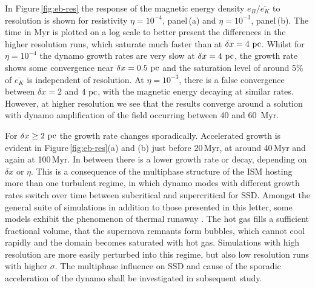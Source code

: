 \documentclass[preprint2]{aastex63}
\newcommand\pc{~ {\rm pc}}
\newcommand\dx{ {\delta x}}
\begin{document}
In Figure\,\ref{fig:eb-res} the response of the magnetic energy density 
$e_B/\overline{e_K}$ to resolution is shown for resistivity $\eta=10^{-4}$,
panel\,(a) and $\eta=10^{-3}$, panel\,(b).
The time in Myr is plotted on a log scale to better present the differences in 
the higher resolution runs, which saturate much faster than at $\dx=4\pc$.
Whilst for $\eta=10^{-4}$ the dynamo growth rates are very slow at $\dx=4\pc$,
the growth rate shows some convergence near $\dx=0.5\pc$ and the saturation
level of around 5\% of $\overline{e_K}$ is independent of resolution.
At $\eta=10^{-3}$, there is a false convergence \citep{FMA91} between
$\dx=2$ and $4\pc$, with the magnetic energy decaying at similar
rates. However, at higher resolution we see that the results converge around a
solution with dynamo amplification of the field occurring between
40 and 60~Myr.

For $\dx\geq2\pc$ the growth rate changes sporadically.
Accelerated growth is evident in Figure\,\ref{fig:eb-res}(a) and (b) just
before 20\,Myr, at around 40\,Myr and again at 100\,Myr.
In between there is a lower growth rate or decay, depending on $\dx$ or $\eta$.
This is a consequence of the multiphase structure of the ISM hosting more than
one turbulent regime, in which dynamo modes with different growth rates 
switch over time between subcritical and supercritical for SSD.
Amongst the general suite of simulations in addition to those presented in this
letter, some models exhibit the phenomenon of thermal runaway
\citep[see e.g.,][]{LOCBN15}.
The hot gas fills a sufficient fractional volume, that the supernova remnants 
form bubbles, which cannot cool rapidly and the domain becomes saturated 
with hot gas.
Simulations with high resolution are more easily perturbed into this regime, but
also low resolution runs with higher $\dot\sigma$.
The multiphase influence on SSD and cause of the sporadic acceleration of the
dynamo shall be investigated in subsequent study.
%
\end{document}
